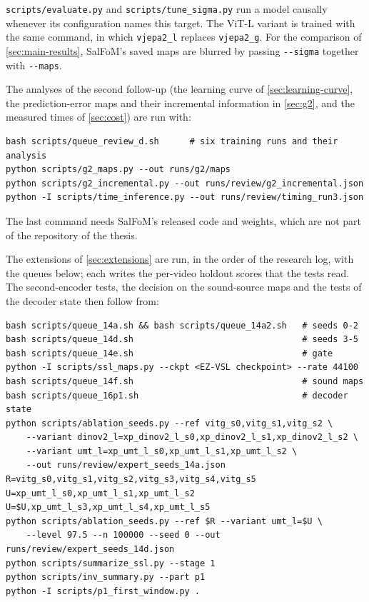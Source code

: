 \noindent \verb|scripts/evaluate.py| and \verb|scripts/tune_sigma.py| run a model
causally whenever its configuration names this target. The \acrshort{ViT}-L variant is
trained with the same command, in which \verb|vjepa2_l| replaces \verb|vjepa2_g|.
For the comparison of \cref{sec:main-results}, SalFoM's saved maps
are blurred by passing \verb|--sigma| together with \verb|--maps|.

The analyses of the second follow-up (the learning curve of
\cref{sec:learning-curve}, the prediction-error maps and their incremental
information in \cref{sec:g2}, and the measured times of \cref{sec:cost}) are
run with:

\begin{small}
\begin{verbatim}
bash scripts/queue_review_d.sh      # six training runs and their analysis
python scripts/g2_maps.py --out runs/g2/maps
python scripts/g2_incremental.py --out runs/review/g2_incremental.json
python -I scripts/time_inference.py --out runs/review/timing_run3.json
\end{verbatim}
\end{small}

\noindent The last command needs SalFoM's released code and weights, which are
not part of the repository of the thesis.

The extensions of \cref{sec:extensions} are run, in the order of the research
log, with the queues below; each writes the per-video holdout scores that the
tests read. The second-encoder tests, the decision on the sound-source maps and
the tests of the decoder state then follow from:

\begin{small}
\begin{verbatim}
bash scripts/queue_14a.sh && bash scripts/queue_14a2.sh   # seeds 0-2
bash scripts/queue_14d.sh                                 # seeds 3-5
bash scripts/queue_14e.sh                                 # gate
python -I scripts/ssl_maps.py --ckpt <EZ-VSL checkpoint> --rate 44100
bash scripts/queue_14f.sh                                 # sound maps
bash scripts/queue_16p1.sh                                # decoder state
python scripts/ablation_seeds.py --ref vitg_s0,vitg_s1,vitg_s2 \
    --variant dinov2_l=xp_dinov2_l_s0,xp_dinov2_l_s1,xp_dinov2_l_s2 \
    --variant umt_l=xp_umt_l_s0,xp_umt_l_s1,xp_umt_l_s2 \
    --out runs/review/expert_seeds_14a.json
R=vitg_s0,vitg_s1,vitg_s2,vitg_s3,vitg_s4,vitg_s5
U=xp_umt_l_s0,xp_umt_l_s1,xp_umt_l_s2
U=$U,xp_umt_l_s3,xp_umt_l_s4,xp_umt_l_s5
python scripts/ablation_seeds.py --ref $R --variant umt_l=$U \
    --level 97.5 --n 100000 --seed 0 --out runs/review/expert_seeds_14d.json
python scripts/summarize_ssl.py --stage 1
python scripts/inv_summary.py --part p1
python -I scripts/p1_first_window.py .
\end{verbatim}
\end{small}

